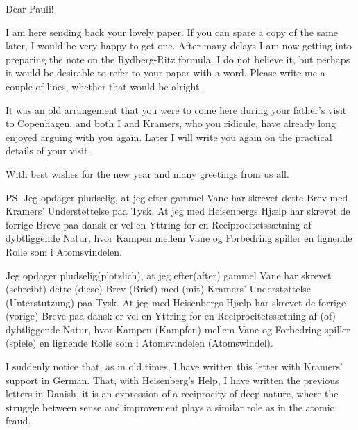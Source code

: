 \begin{letter}{81}
\begin{header}
\date{1925/01/10}

\makeheader

\end{header}

Dear Pauli!

I am here sending back your lovely paper. If you can spare a copy of the same later, I would be very happy to get one. After many delays I am now getting into preparing the note on the Rydberg-Ritz formula. I do not believe it, but perhaps it would be desirable to refer to your paper with a word. Please write me a couple of lines, whether that would be alright.

It was an old arrangement that you were to come here during your father's visit to Copenhagen, and both I and Kramers, who you ridicule, have already long enjoyed arguing with you again. Later I will write you again on the practical details of your visit.

With best wishes for the new year and many greetings from us all.

PS. Jeg opdager pludselig, at jeg efter gammel Vane har skrevet dette Brev med Kramers' Understøttelse paa Tysk. At jeg med Heisenbergs Hjælp har skrevet de forrige Breve paa dansk er vel en Yttring for en Reciprocitetssætning af dybtliggende Natur, hvor Kampen mellem Vane og Forbedring spiller en lignende Rolle som i Atomsvindelen.

Jeg opdager pludselig(plotzlich), at jeg efter(after) gammel Vane har skrevet (schreibt) dette (diese) Brev (Brief) med (mit) Kramers' Understøttelse (Unterstutzung) paa Tysk. At jeg med Heisenbergs Hjælp har skrevet de forrige (vorige) Breve paa dansk er vel en Yttring for en Reciprocitetssætning af (of) dybtliggende Natur, hvor Kampen (Kampfen) mellem Vane og Forbedring spiller (spiele) en lignende Rolle som i Atomsvindelen (Atomswindel).


I suddenly notice that, as in old times, I have written this letter with Kramers' support in German. That, with Heisenberg's Help, I have written the previous letters in Danish, it is an expression of a reciprocity of deep nature, where the struggle between sense and improvement plays a similar role as in the atomic fraud.

\end{letter}